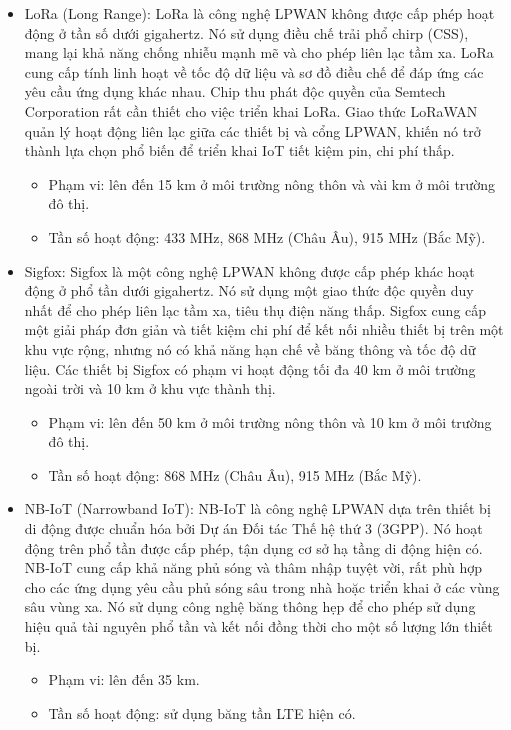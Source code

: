 \documentclass{article} %
\begin{document}
	\begin{itemize}
		\item LoRa (Long Range): LoRa là công nghệ LPWAN không được cấp phép hoạt động ở tần số dưới gigahertz. Nó sử dụng điều chế trải phổ chirp (CSS), mang lại khả năng chống nhiễu mạnh mẽ và cho phép liên lạc tầm xa. LoRa cung cấp tính linh hoạt về tốc độ dữ liệu và sơ đồ điều chế để đáp ứng các yêu cầu ứng dụng khác nhau. Chip thu phát độc quyền của Semtech Corporation rất cần thiết cho việc triển khai LoRa. Giao thức LoRaWAN quản lý hoạt động liên lạc giữa các thiết bị và cổng LPWAN, khiến nó trở thành lựa chọn phổ biến để triển khai IoT tiết kiệm pin, chi phí thấp.
		\begin{itemize}
			\item Phạm vi: lên đến 15 km ở môi trường nông thôn và vài km ở môi trường đô thị.
			\item Tần số hoạt động: 433 MHz, 868 MHz (Châu Âu), 915 MHz (Bắc Mỹ).
		\end{itemize}
		
		\item Sigfox: Sigfox là một công nghệ LPWAN không được cấp phép khác hoạt động ở phổ tần dưới gigahertz. Nó sử dụng một giao thức độc quyền duy nhất để cho phép liên lạc tầm xa, tiêu thụ điện năng thấp. Sigfox cung cấp một giải pháp đơn giản và tiết kiệm chi phí để kết nối nhiều thiết bị trên một khu vực rộng, nhưng nó có khả năng hạn chế về băng thông và tốc độ dữ liệu. Các thiết bị Sigfox có phạm vi hoạt động tối đa 40 km ở môi trường ngoài trời và 10 km ở khu vực thành thị.
		\begin{itemize}
			\item Phạm vi: lên đến 50 km ở môi trường nông thôn và 10 km ở môi trường đô thị.
			\item Tần số hoạt động: 868 MHz (Châu Âu), 915 MHz (Bắc Mỹ).
		\end{itemize}
		
		\item NB-IoT (Narrowband IoT): NB-IoT là công nghệ LPWAN dựa trên thiết bị di động được chuẩn hóa bởi Dự án Đối tác Thế hệ thứ 3 (3GPP). Nó hoạt động trên phổ tần được cấp phép, tận dụng cơ sở hạ tầng di động hiện có. NB-IoT cung cấp khả năng phủ sóng và thâm nhập tuyệt vời, rất phù hợp cho các ứng dụng yêu cầu phủ sóng sâu trong nhà hoặc triển khai ở các vùng sâu vùng xa. Nó sử dụng công nghệ băng thông hẹp để cho phép sử dụng hiệu quả tài nguyên phổ tần và kết nối đồng thời cho một số lượng lớn thiết bị.
		\begin{itemize}
			\item Phạm vi: lên đến 35 km.
			\item Tần số hoạt động: sử dụng băng tần LTE hiện có.
		\end{itemize}    
	\end{itemize}
	
\end{document}

